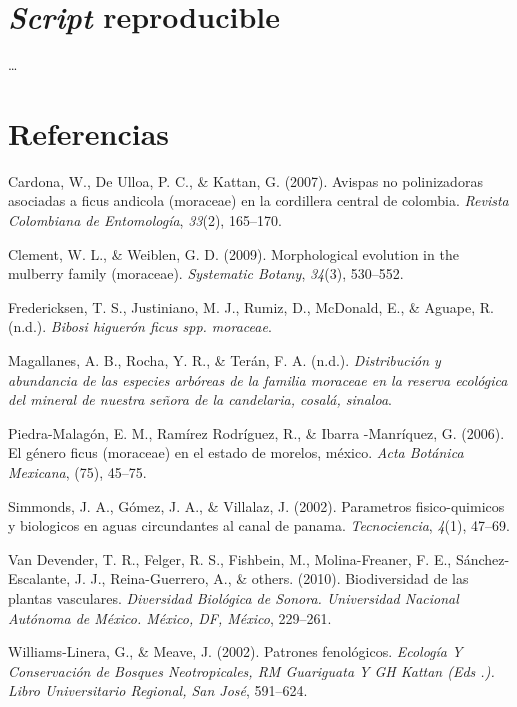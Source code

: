 \documentclass[11pt,]{article}
\begin{document}
\section{\texorpdfstring{\emph{Script}
reproducible}{Script reproducible}}\label{script-reproducible}

\ldots

\section*{Referencias}\label{referencias}

\hypertarget{refs}{}
\hypertarget{ref-cardona2007avispas}{}
Cardona, W., De Ulloa, P. C., \& Kattan, G. (2007). Avispas no
polinizadoras asociadas a ficus andicola (moraceae) en la cordillera
central de colombia. \emph{Revista Colombiana de Entomología},
\emph{33}(2), 165--170.

\hypertarget{ref-clement2009morphological}{}
Clement, W. L., \& Weiblen, G. D. (2009). Morphological evolution in the
mulberry family (moraceae). \emph{Systematic Botany}, \emph{34}(3),
530--552.

\hypertarget{ref-fredericksenbibosi}{}
Fredericksen, T. S., Justiniano, M. J., Rumiz, D., McDonald, E., \&
Aguape, R. (n.d.). \emph{Bibosi higuerón ficus spp. moraceae}.

\hypertarget{ref-magallanesdistribucion}{}
Magallanes, A. B., Rocha, Y. R., \& Terán, F. A. (n.d.).
\emph{Distribución y abundancia de las especies arbóreas de la familia
moraceae en la reserva ecológica del mineral de nuestra señora de la
candelaria, cosalá, sinaloa}.

\hypertarget{ref-piedra2006genero}{}
Piedra-Malagón, E. M., Ramírez Rodríguez, R., \& Ibarra -Manríquez, G.
(2006). El género ficus (moraceae) en el estado de morelos, méxico.
\emph{Acta Botánica Mexicana}, (75), 45--75.

\hypertarget{ref-simmonds2002parametros}{}
Simmonds, J. A., Gómez, J. A., \& Villalaz, J. (2002). Parametros
fisico-quimicos y biologicos en aguas circundantes al canal de panama.
\emph{Tecnociencia}, \emph{4}(1), 47--69.

\hypertarget{ref-van2010biodiversidad}{}
Van Devender, T. R., Felger, R. S., Fishbein, M., Molina-Freaner, F. E.,
Sánchez-Escalante, J. J., Reina-Guerrero, A., \& others. (2010).
Biodiversidad de las plantas vasculares. \emph{Diversidad Biológica de
Sonora. Universidad Nacional Autónoma de México. México, DF, México},
229--261.

\hypertarget{ref-williams2002patrones}{}
Williams-Linera, G., \& Meave, J. (2002). Patrones fenológicos.
\emph{Ecología Y Conservación de Bosques Neotropicales, RM Guariguata Y
GH Kattan (Eds .). Libro Universitario Regional, San José}, 591--624.




\newpage
\singlespacing 
\end{document}
